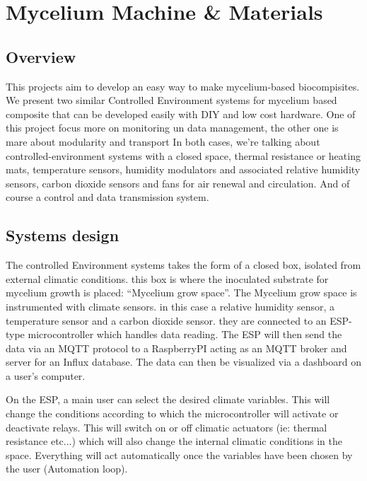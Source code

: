 \chapter{Mycelium Machine \& Materials}


\section{Overview}

This projects aim to develop an easy way to make mycelium-based biocompisites. We present two similar Controlled Environment systems for mycelium based composite that can be developed easily with DIY and low cost hardware.
One of this project focus more on monitoring un data management, the other one is mare about modularity and transport 
In both cases, we're talking about controlled-environment systems with a closed space, thermal resistance or heating mats, temperature sensors, humidity modulators and associated relative humidity sensors, carbon dioxide sensors and fans for air renewal and circulation. 
And of course a control and data transmission system. 


\section{Systems design}

The controlled Environment systems takes the form of a closed box, isolated from external climatic conditions. this box is where the inoculated substrate for mycelium growth is placed: “Mycelium grow space”. 
The Mycelium grow space is instrumented with climate sensors. in this case a relative humidity sensor, a temperature sensor and a carbon dioxide sensor. they are connected to an ESP-type microcontroller which handles data reading.
The ESP will then send the data via an MQTT protocol to a RaspberryPI acting as an MQTT broker and server for an Influx database. The data can then be visualized via a dashboard on a user's computer. 

On the ESP, a main user can select the desired climate variables. This will change the conditions according to which the microcontroller will activate or deactivate relays. This will switch on or off climatic actuators (ie: thermal resistance etc...) which will also change the internal climatic conditions in the space.  
Everything will act automatically once the variables have been chosen by the user (Automation loop). 

